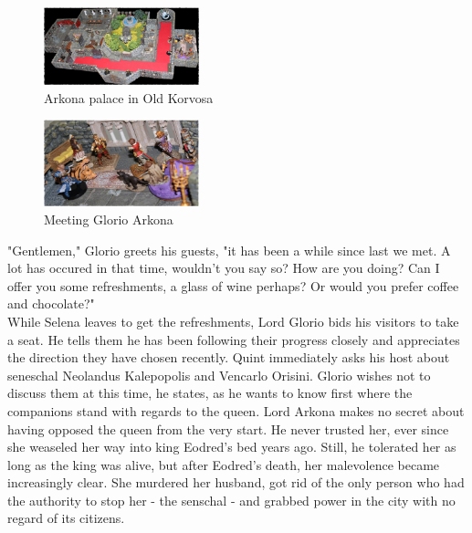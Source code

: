 \begin{figure}[h]
	\centering
	\includegraphics[width=0.4\textwidth]{images/Arkona-palace-in-Old-Korvosa-563928457_mod.jpg}
	\caption{Arkona palace in Old Korvosa}
	\label{fig:Arkona-palace-in-Old-Korvosa-563928457}
\end{figure}

\begin{figure}[h]
	\centering
	\includegraphics[width=0.4\textwidth]{images/Meeting-Glorio-Arkona-563929464_mod.jpg}
	\caption{Meeting Glorio Arkona}
	\label{fig:Meeting-Glorio-Arkona-563929464}
\end{figure}

"Gentlemen," Glorio greets his guests, "it has been a while since last we met. A lot has occured in that time, wouldn't you say so? How are you doing? Can I offer you some refreshments, a glass of wine perhaps? Or would you prefer coffee and chocolate?"\\

While Selena leaves to get the refreshments, Lord Glorio bids his visitors to take a seat. He tells them he has been following their progress closely and appreciates the direction they have chosen recently. Quint immediately asks his host about seneschal Neolandus Kalepopolis and Vencarlo Orisini. Glorio wishes not to discuss them at this time, he states, as he wants to know first where the companions stand with regards to the queen. Lord Arkona makes no secret about having opposed the queen from the very start. He never trusted her, ever since she weaseled her way into king Eodred's bed years ago. Still, he tolerated her as long as the king was alive, but after Eodred's death, her malevolence became increasingly clear. She murdered her husband, got rid of the only person who had the authority to stop her - the senschal - and grabbed power in the city with no regard of its citizens.\\

